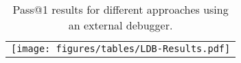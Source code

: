 \begin{table}[h]
    \centering
    \begin{tabular}{c}
    \hspace*{-0.35cm}
    \texttt{[image: figures/tables/LDB-Results.pdf]}
    \end{tabular}
    \caption{Pass@1 results for different approaches using an external debugger.}
    \label{tab:ldb-results}
\end{table}
